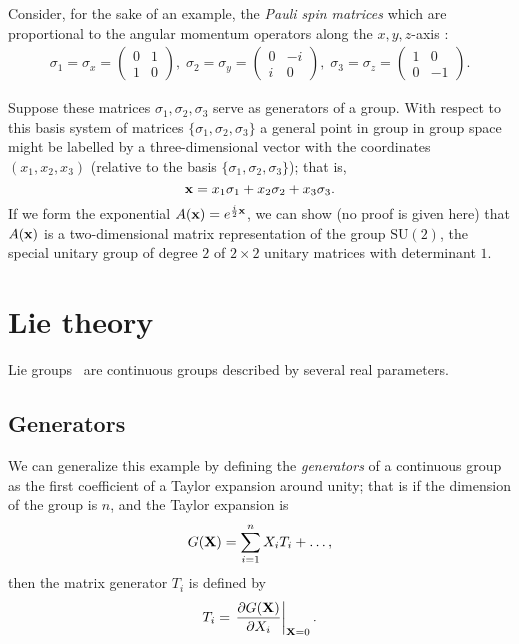 {\color{blue}
\bexample
Consider, for the sake of an example, the
{\em Pauli spin matrices}
which are proportional to the angular momentum operators along the $x,y,z$-axis
\cite{schiff-55}:
\begin{equation}
\begin{split}
\sigma_1=\sigma_x
=
\begin{pmatrix}
0&1\\
1&0
\end{pmatrix}
,
\;
\sigma_2=\sigma_y
=
\begin{pmatrix}
0&-i\\
i&0
\end{pmatrix}
,
\;
\sigma_3=\sigma_z
=
\begin{pmatrix}
1&0\\
0&-1
\end{pmatrix}
.
\end{split}
\end{equation}

Suppose these matrices $\sigma_1,\sigma_2,\sigma_3$
serve as generators of a group.
With respect to this basis system of matrices $\{ \sigma_1,\sigma_2,\sigma_3\}$
a general point in group in group space might be labelled by a three-dimensional
vector with the coordinates $(x_1,x_2,x_3)$
(relative to the basis $\{ \sigma_1,\sigma_2,\sigma_3\}$);
that is,
\begin{equation}
{\bf x} =   x_1\sigma_1 + x_2\sigma_2 +x_3 \sigma_3.
\end{equation}
If we form the exponential $  A  ({\bf x})= e^{\frac{i}{2} {\bf x}}$,
we can show (no proof is given here)
that $  A  ({\bf x})$ is a two-dimensional matrix representation of the group $\textrm{SU}(2)$,
the special unitary group of degree $2$ of $2\times 2$ unitary matrices with determinant $1$.
}

\section{Lie theory}

Lie groups~\cite[-0mm]{hall-2000,hall-2015} are continuous groups described by several real parameters.

\subsection{Generators}
We can generalize this example by defining
the {\em generators}
of a continuous group as the first coefficient of a Taylor expansion
around unity; that is if the dimension of the group is $n$, and the Taylor expansion is
\begin{equation}
  G  ({\bf X}) =   \sum_{i=1}^n X_i   T  _i + \ldots ,
\end{equation}
then the matrix generator $T_i$ is defined by
\begin{equation}
  T  _i = \left. \frac{\partial   G  ({\bf X})}{\partial X_i} \right|_{ {\bf X}=0}.
\end{equation}


